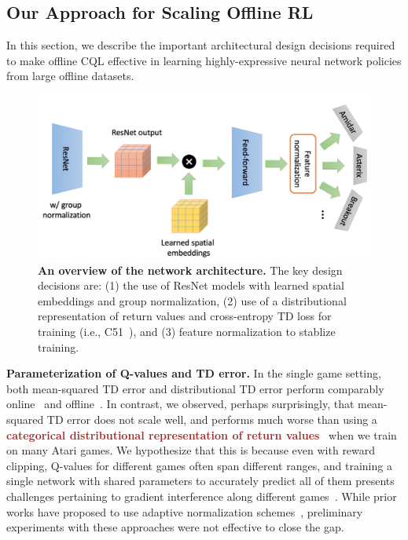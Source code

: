 \vspace{-0.35cm}
\subsection{Our Approach for Scaling Offline RL}
\label{sec:scaledql_method}
\vspace{-0.3cm}

In this section, we describe the important architectural design decisions required to make offline CQL effective in learning highly-expressive neural network policies from large offline datasets. 

\begin{figure}[t]
    \centering
    \includegraphics[width=0.6\linewidth]{chapters/scaled_ql/figures/network_figure.pdf}
    \vspace{-0.3cm}
    \caption{\footnotesize{\textbf{An overview of the network architecture.} The key design decisions are: (1) the use of ResNet models with learned spatial embeddings and group normalization, (2) use of a distributional representation of return values and cross-entropy TD loss for training (i.e., C51~\citep{bellemare2017distributional}), and (3) feature normalization to stablize training.}}
    \label{fig:architecture}
    \vspace{-0.3cm}
\end{figure}
\textbf{Parameterization of Q-values and TD error.} In the single game setting, both mean-squared TD error and distributional TD error perform comparably online~\citep{agarwal2021deep} and offline~\citep{kumar2020conservative,kumar2021dr3}. In contrast,  
we observed, perhaps surprisingly, that mean-squared TD error does not scale well, and performs much worse than using a \textcolor{brown}{\textbf{categorical distributional representation of return values}}~\citep{bellemare2017distributional} when we train on many Atari games. We hypothesize that this is because even with reward clipping, Q-values for different games often span different ranges, and training a single network with shared parameters to accurately predict all of them presents challenges pertaining to gradient interference along different games~\citep{hessel2019popart, yu2020gradient}. 
While prior works have proposed to use adaptive normalization schemes~\citep{hessel2019popart,kurin2022defense}, preliminary experiments with these approaches were not effective to close the gap. 

